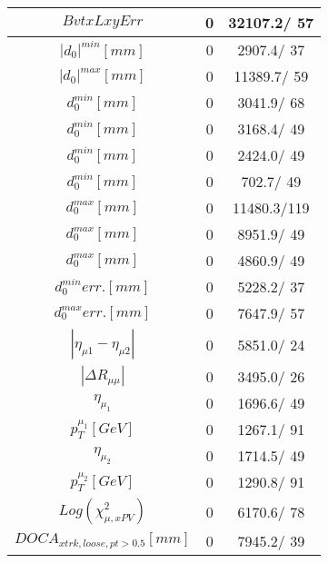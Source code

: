 \documentclass{article}
\begin{document}
\begin{table}[htbp]
\begin{center}
\begin{tabular}{c|c|c}
\hline
$BvtxLxyErr$ & 0 & 32107.2/ 57\\
\hline
$|d_{0}|^{min} [mm]$ & 0 & 2907.4/ 37\\
\hline
$|d_{0}|^{max} [mm]$ & 0 & 11389.7/ 59\\
\hline
$d_{0}^{min} [mm]$ & 0 & 3041.9/ 68\\
\hline
$d_{0}^{min} [mm]$ & 0 & 3168.4/ 49\\
\hline
$d_{0}^{min} [mm]$ & 0 & 2424.0/ 49\\
\hline
$d_{0}^{min} [mm]$ & 0 & 702.7/ 49\\
\hline
$d_{0}^{max} [mm]$ & 0 & 11480.3/119\\
\hline
$d_{0}^{max} [mm]$ & 0 & 8951.9/ 49\\
\hline
$d_{0}^{max} [mm]$ & 0 & 4860.9/ 49\\
\hline
$d_{0}^{min} err. [mm]$ & 0 & 5228.2/ 37\\
\hline
$d_{0}^{max} err. [mm]$ & 0 & 7647.9/ 57\\
\hline
$|\eta_{\mu1}-\eta_{\mu2}|$ & 0 & 5851.0/ 24\\
\hline
$|\Delta R_{\mu \mu}|$ & 0 & 3495.0/ 26\\
\hline
$\eta_{\mu_{1}}$ & 0 & 1696.6/ 49\\
\hline
$p_{T}^{\mu_{1}} [GeV]$ & 0 & 1267.1/ 91\\
\hline
$\eta_{\mu_{2}}$ & 0 & 1714.5/ 49\\
\hline
$p_{T}^{\mu_{2}} [GeV]$ & 0 & 1290.8/ 91\\
\hline
$Log(\chi^{2}_{\mu,xPV})$ & 0 & 6170.6/ 78\\
\hline
$DOCA_{xtrk, loose, pt>0.5} [mm]$ & 0 & 7945.2/ 39\\
\hline
\end{tabular}
\end{center}
\end{table}
\end{document}
